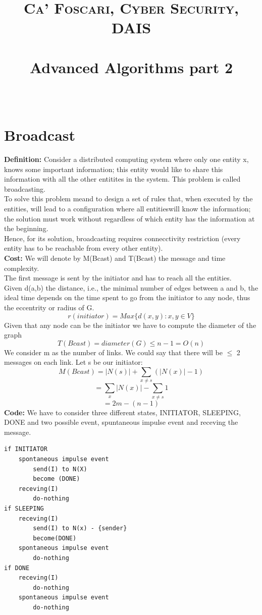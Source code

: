 \documentclass[paper=a4, fontsize=11pt]{scrartcl} %
\title{	
\normalfont \normalsize 
\textsc{Ca' Foscari, Cyber Security, DAIS} \\ [25pt] %
\horrule{0.5pt} \\[0.4cm] %
\huge Advanced Algorithms part 2 \\ %
\horrule{2pt} \\[0.5cm] %
}
\numberwithin{equation}{section} %
\numberwithin{figure}{section} %
\numberwithin{table}{section} %
\begin{document}
\maketitle %

\section*{Broadcast}
\textbf{Definition:} Consider a distributed computing system where only one entity x, knows some important information; this entity would like to share this information with all the other entitites in the system. This problem is called broadcasting.\\
To solve this problem meand to design a set of rules that, when executed by the entities, will lead to a configuration where all entitieswill know the information; the solution must work without regardless of which entity has the information at the beginning.\\
Hence, for its solution, broadcasting requires connecctivity restriction (every entity has to be reachable from every other entity). \\
\textbf{Cost:} We will denote by M(Bcast) and T(Bcast) the message and time complexity. \\
The first message is sent by the initiator and has to reach all the entities.\\
Given d(a,b) the distance, i.e., the minimal number of edges between a and b, the ideal time depends on the time spent to go from the initiator to any node, thus the eccentrity or radius of G.
$$r(initiator) = Max\{d(x,y) : x,y \in V\}$$
Given that any node can be the initiator we have to compute the diameter of the graph
$$T(Bcast) = diameter(G) \leq n-1 = O(n)$$
We consider m as the number of links. We could say that there will be $\leq$ 2 messages on each link. Let s be our initiator: 
\newpage
$$M(Bcast) = |N(s)| + \sum_{x \neq s} (|N(x)|-1)$$
$$= \sum_{x}|N(x)| - \sum_{x \neq s}1$$
$$= 2m - (n-1)$$ 
\textbf{Code:} We have to consider three different states, INITIATOR, SLEEPING, DONE and two possible event, spuntaneous impulse event and receving the message.
\begin{lstlisting}
if INITIATOR
	spontaneous impulse event
		send(I) to N(X)
		become (DONE)
	receving(I)
		do-nothing
if SLEEPING
	receving(I)
		send(I) to N(x) - {sender}
		become(DONE)
	spontaneous impulse event
		do-nothing
if DONE
	receving(I)
		do-nothing
	spontaneous impulse event
		do-nothing				
\end{lstlisting}
\end{document}
